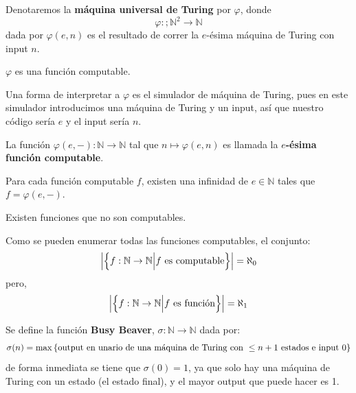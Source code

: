 \documentclass[12pt]{report}
\theoremstyle{largebreak}
\newcommand\abs[1]{\ensuremath{\left|#1\right|}}
\newcommand\cf[3]{\ensuremath{#1:#2\rightarrow#3}}
\begin{document}
    \begin{mydef}
        Denotaremos la \textbf{máquina universal de Turing} por $\varphi$, donde
        \begin{equation*}
            \cf{\varphi}{;\mathbb{N}^2}{\mathbb{N}}
        \end{equation*}
        dada por $\varphi(e,n)$ es el resultado de correr la $e$-ésima máquina de Turing con input $n$.
    \end{mydef}

    \begin{obs}
        $\varphi$ es una función computable.
    \end{obs}

    Una forma de interpretar a $\varphi$ es el simulador de máquina de Turing, pues en este simulador introducimos una máquina de Turing y un input, así que nuestro código sería $e$ y el input sería $n$.
    
    \begin{mydef}
        La función $\cf{\varphi(e,-)}{\mathbb{N}}{\mathbb{N}}$ tal que $n\mapsto\varphi(e,n)$ es llamada la \textbf{$e$-ésima función computable}.
    \end{mydef}

    \begin{theor}
        Para cada función computable $f$, existen una infinidad de $e\in\mathbb{N}$ tales que $f=\varphi(e,-)$.
    \end{theor}

    Existen funciones que no son computables.

    \begin{obs}
        Como se pueden enumerar todas las funciones computables, el conjunto:
        \begin{equation*}
            \abs{\left\{\cf{f}{\mathbb{N}}{\mathbb{N}}\Big|f\textup{ es computable}\right\}}=\aleph_0
        \end{equation*}
        pero,
        \begin{equation*}
            \abs{\left\{\cf{f}{\mathbb{N}}{\mathbb{N}}\Big|f\textup{ es función} \right\}}=\aleph_1
        \end{equation*}
    \end{obs}

    \begin{exa}
        Se define la función \textbf{Busy Beaver}, $\cf{\sigma}{\mathbb{N}}{\mathbb{N}}$ dada por:
        \begin{equation*}
            \sigma(n)=\max\left\{\textup{output en unario de una máquina de Turing con }\leq n+1\textup{ estados e input }0 \right\}
        \end{equation*}
        de forma inmediata se tiene que $\sigma(0)=1$, ya que solo hay una máquina de Turing con un estado (el estado final), y el mayor output que puede hacer es 1.
    \end{exa}
\end{document}

